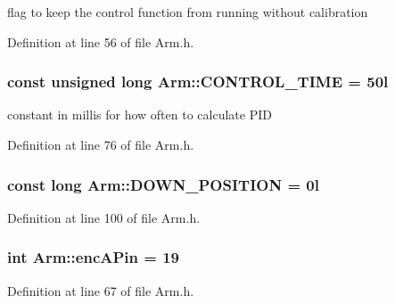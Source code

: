 flag to keep the control function from running without calibration 



Definition at line 56 of file Arm.\-h.

\hypertarget{classArm_ae85014b5f9a8698790faa73bae76217c}{
\subsubsection[{C\-O\-N\-T\-R\-O\-L\-\_\-\-T\-I\-M\-E}]{\setlength{\rightskip}{0pt plus 5cm}const unsigned long Arm\-::\-C\-O\-N\-T\-R\-O\-L\-\_\-\-T\-I\-M\-E = 50l\hspace{0.3cm}{\ttfamily [private]}}}\label{classArm_ae85014b5f9a8698790faa73bae76217c}


constant in millis for how often to calculate P\-I\-D 



Definition at line 76 of file Arm.\-h.

\hypertarget{classArm_a3a95b43d43f1e4858829ff474555f81f}{
\subsubsection[{D\-O\-W\-N\-\_\-\-P\-O\-S\-I\-T\-I\-O\-N}]{\setlength{\rightskip}{0pt plus 5cm}const long Arm\-::\-D\-O\-W\-N\-\_\-\-P\-O\-S\-I\-T\-I\-O\-N = 0l\hspace{0.3cm}{\ttfamily [private]}}}\label{classArm_a3a95b43d43f1e4858829ff474555f81f}


Definition at line 100 of file Arm.\-h.

\hypertarget{classArm_ad36ceeef302fda4b8e162feae7961c41}{
\subsubsection[{enc\-A\-Pin}]{\setlength{\rightskip}{0pt plus 5cm}int Arm\-::enc\-A\-Pin = 19\hspace{0.3cm}{\ttfamily [private]}}}\label{classArm_ad36ceeef302fda4b8e162feae7961c41}


Definition at line 67 of file Arm.\-h.

